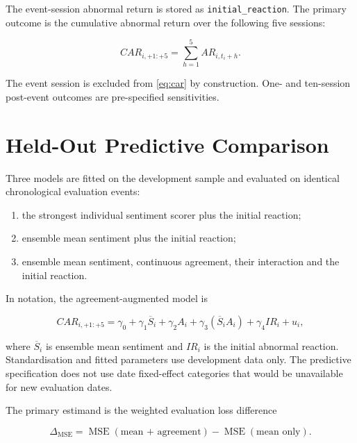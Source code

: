 \documentclass[11pt,a4paper,oneside]{book}
\begin{document}
The event-session abnormal return is stored as \texttt{initial\_reaction}.
The primary outcome is the cumulative abnormal return over the following five sessions:

\begin{equation}
  CAR_{i,+1:+5} = \sum_{h=1}^{5} AR_{i,t_i+h}.
  \label{eq:car}
\end{equation}

The event session is excluded from \cref{eq:car} by construction.
One- and ten-session post-event outcomes are pre-specified sensitivities.

\section{Held-Out Predictive Comparison}
\label{sec:method-prediction}

Three models are fitted on the development sample and evaluated on identical chronological evaluation events:

\begin{enumerate}
  \item the strongest individual sentiment scorer plus the initial reaction;
  \item ensemble mean sentiment plus the initial reaction;
  \item ensemble mean sentiment, continuous agreement, their interaction and the initial reaction.
\end{enumerate}

In notation, the agreement-augmented model is

\begin{equation}
  CAR_{i,+1:+5} =
  \gamma_0 + \gamma_1 \overline{S}_i + \gamma_2 A_i
  + \gamma_3\left(\overline{S}_i A_i\right)
  + \gamma_4 IR_i + u_i,
  \label{eq:predictive-model}
\end{equation}

where $\overline{S}_i$ is ensemble mean sentiment and $IR_i$ is the initial abnormal reaction.
Standardisation and fitted parameters use development data only.
The predictive specification does not use date fixed-effect categories that would be unavailable for new evaluation dates.

The primary estimand is the weighted evaluation loss difference

\begin{equation}
  \Delta_{\mathrm{MSE}} =
  \operatorname{MSE}(\text{mean + agreement})
  - \operatorname{MSE}(\text{mean only}).
  \label{eq:mse-difference}
\end{equation}
\end{document}
